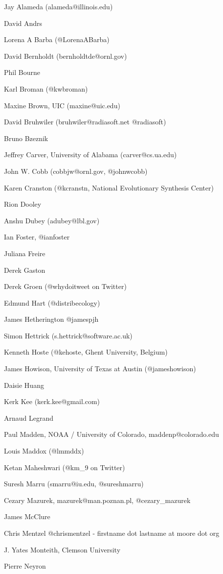 \documentclass[11pt, oneside]{amsart}
\begin{document}
Jay Alameda (alameda@illinois.edu)

David Andrs

Lorena A Barba (@LorenaABarba)

David Bernholdt (bernholdtde@ornl.gov)

Phil Bourne

Karl Broman (@kwbroman)

Maxine Brown, UIC (maxine@uic.edu)

David Bruhwiler   (bruhwiler@radiasoft.net    @radiasoft)

Bruno Bzeznik

Jeffrey Carver, University of Alabama (carver@cs.ua.edu)

John W. Cobb (cobbjw@ornl.gov, @johnwcobb)

Karen Cranston (@kcranstn, National Evolutionary Synthesis Center)

Rion Dooley

Anshu Dubey (adubey@lbl.gov)

Ian Foster, @ianfoster

Juliana Freire

Derek Gaston

Derek Groen (@whydoitweet on Twitter)

Edmund Hart (@distribecology)

James Hetherington @jamespjh

Simon Hettrick (s.hettrick@software.ac.uk)

Kenneth Hoste (@kehoste, Ghent University, Belgium)

James Howison, University of Texas at Austin (@jameshowison)

Daisie Huang

Kerk Kee (kerk.kee@gmail.com)

Arnaud Legrand

Paul Madden, NOAA / University of Colorado, maddenp@colorado.edu

Louis Maddox (@lmmddx)

Ketan Maheshwari (@km\_9 on Twitter)

Suresh Marru (smarru@iu.edu, @sureshmarru) 

Cezary Mazurek, mazurek@man.poznan.pl, @cezary\_mazurek

James McClure

Chris Mentzel @chrismentzel - firstname dot lastname at moore dot org

J. Yates Monteith, Clemson University

Pierre Neyron
\end{document}
